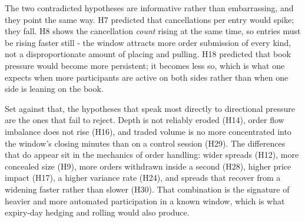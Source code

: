 \documentclass[11pt,a4paper]{article}
\begin{document}
The two contradicted hypotheses are informative rather than embarrassing, and they point the
same way. H7 predicted that cancellations per entry would spike; they fall. H8 shows the
cancellation \emph{count} rising at the same time, so entries must be rising faster still -
the window attracts more order submission of every kind, not a disproportionate amount of
placing and pulling. H18 predicted that book pressure would become more persistent; it
becomes less so, which is what one expects when more participants are active on both sides
rather than when one side is leaning on the book.

Set against that, the hypotheses that speak most directly to directional pressure are the
ones that fail to reject. Depth is not reliably eroded (H14), order flow imbalance does not
rise (H16), and traded volume is no more concentrated into the window's closing minutes than
on a control session (H29). The differences that do appear sit in the mechanics of order
handling: wider spreads (H12), more concealed size (H9), more orders withdrawn inside a
second (H28), higher price impact (H17), a higher variance rate (H24), and spreads that
recover from a widening faster rather than slower (H30). That combination is the signature
of heavier and more automated participation in a known window, which is what expiry-day
hedging and rolling would also produce.
\end{document}
